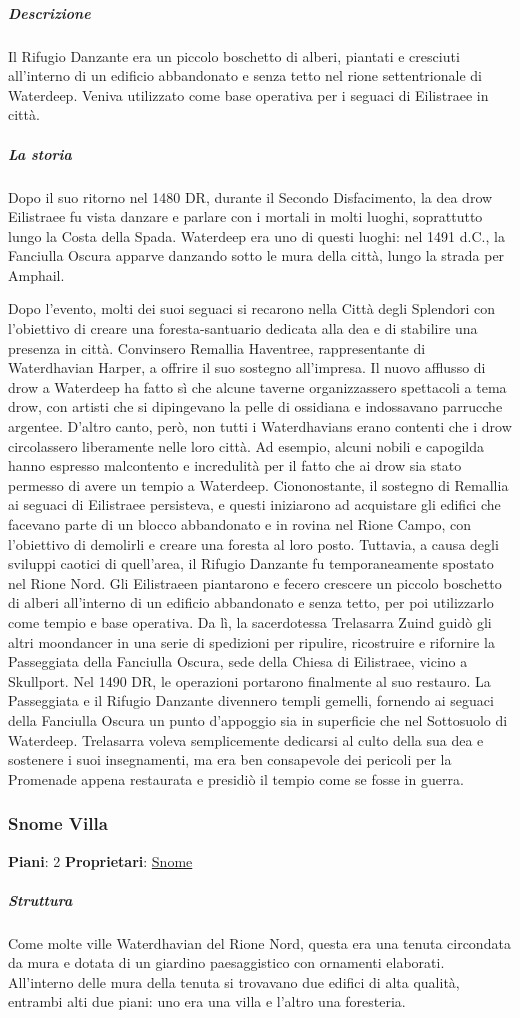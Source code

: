 \documentclass{article}
\begin{document}
\subparagraph{Descrizione}
Il Rifugio Danzante era un piccolo boschetto di alberi, piantati e cresciuti all'interno di un edificio abbandonato e senza tetto nel rione settentrionale di Waterdeep. Veniva utilizzato come base operativa per i seguaci di Eilistraee in città.

\subparagraph{La storia}
Dopo il suo ritorno nel 1480 DR, durante il Secondo Disfacimento, la dea drow Eilistraee fu vista danzare e parlare con i mortali in molti luoghi, soprattutto lungo la Costa della Spada. Waterdeep era uno di questi luoghi: nel 1491 d.C., la Fanciulla Oscura apparve danzando sotto le mura della città, lungo la strada per Amphail.

Dopo l'evento, molti dei suoi seguaci si recarono nella Città degli Splendori con l'obiettivo di creare una foresta-santuario dedicata alla dea e di stabilire una presenza in città. Convinsero Remallia Haventree, rappresentante di Waterdhavian Harper, a offrire il suo sostegno all'impresa. Il nuovo afflusso di drow a Waterdeep ha fatto sì che alcune taverne organizzassero spettacoli a tema drow, con artisti che si dipingevano la pelle di ossidiana e indossavano parrucche argentee. D'altro canto, però, non tutti i Waterdhavians erano contenti che i drow circolassero liberamente nelle loro città. Ad esempio, alcuni nobili e capogilda hanno espresso malcontento e incredulità per il fatto che ai drow sia stato permesso di avere un tempio a Waterdeep.
Ciononostante, il sostegno di Remallia ai seguaci di Eilistraee persisteva, e questi iniziarono ad acquistare gli edifici che facevano parte di un blocco abbandonato e in rovina nel Rione Campo, con l'obiettivo di demolirli e creare una foresta al loro posto. Tuttavia, a causa degli sviluppi caotici di quell'area, il Rifugio Danzante fu temporaneamente spostato nel Rione Nord. Gli Eilistraeen piantarono e fecero crescere un piccolo boschetto di alberi all'interno di un edificio abbandonato e senza tetto, per poi utilizzarlo come tempio e base operativa. Da lì, la sacerdotessa Trelasarra Zuind guidò gli altri moondancer in una serie di spedizioni per ripulire, ricostruire e rifornire la Passeggiata della Fanciulla Oscura, sede della Chiesa di Eilistraee, vicino a Skullport. Nel 1490 DR, le operazioni portarono finalmente al suo restauro. La Passeggiata e il Rifugio Danzante divennero templi gemelli, fornendo ai seguaci della Fanciulla Oscura un punto d'appoggio sia in superficie che nel Sottosuolo di Waterdeep. Trelasarra voleva semplicemente dedicarsi al culto della sua dea e sostenere i suoi insegnamenti, ma era ben consapevole dei pericoli per la Promenade appena restaurata e presidiò il tempio come se fosse in guerra.

\subsubsection{Snome Villa}
\textbf{Piani}: 2
\textbf{Proprietari}: \hyperlink{https://forgottenrealms.fandom.com/wiki/Snome}{Snome}
\subparagraph{Struttura}
Come molte ville Waterdhavian del Rione Nord, questa era una tenuta circondata da mura e dotata di un giardino paesaggistico con ornamenti elaborati. All'interno delle mura della tenuta si trovavano due edifici di alta qualità, entrambi alti due piani: uno era una villa e l'altro una foresteria.
\end{document}
